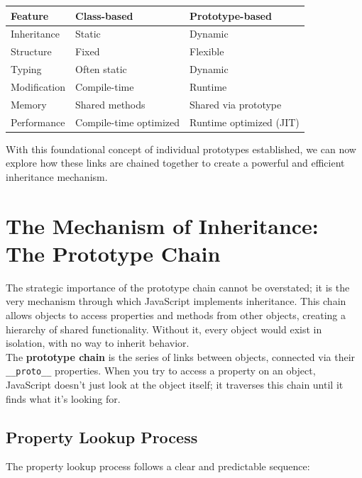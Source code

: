 \documentclass{scrbook}
\begin{document}
\begin{center}
    \begin{tabularx}{\linewidth}{|X|X|X|}
        \hline
        \textbf{Feature} & \textbf{Class-based} & \textbf{Prototype-based} \\
        \hline
        Inheritance & Static & Dynamic \\
        Structure & Fixed & Flexible \\
        Typing & Often static & Dynamic \\
        Modification & Compile-time & Runtime \\
        Memory & Shared methods & Shared via prototype \\
        Performance & Compile-time optimized & Runtime optimized (JIT) \\
        \hline
    \end{tabularx}
\end{center}

With this foundational concept of individual prototypes established, we can now explore how these links are chained together to create a powerful and efficient inheritance mechanism.

\chapter{The Mechanism of Inheritance: The Prototype Chain}

The strategic importance of the prototype chain cannot be overstated; it is the very mechanism through which JavaScript implements inheritance. This chain allows objects to access properties and methods from other objects, creating a hierarchy of shared functionality. Without it, every object would exist in isolation, with no way to inherit behavior. \\

The \textbf{prototype chain} is the series of links between objects, connected via their \texttt{\_\_proto\_\_} properties. When you try to access a property on an object, JavaScript doesn't just look at the object itself; it traverses this chain until it finds what it's looking for.

\section{Property Lookup Process}

The property lookup process follows a clear and predictable sequence:
\end{document}
